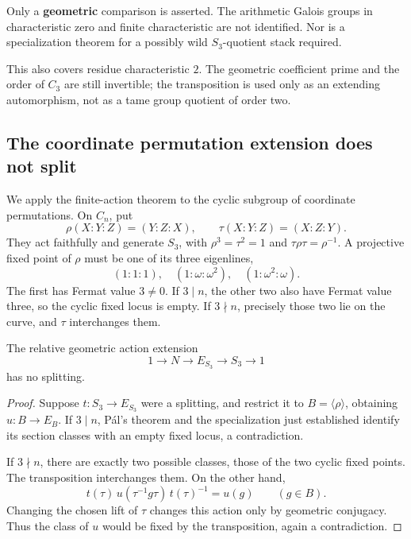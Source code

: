 Only a \textbf{geometric} comparison is asserted. The arithmetic Galois groups in characteristic zero and finite characteristic are not identified. Nor is a specialization theorem for a possibly wild \(S_3\)-quotient stack required.

This also covers residue characteristic \(2\). The geometric coefficient prime and the order of \(C_3\) are still invertible; the transposition is used only as an extending automorphism, not as a tame group quotient of order two.

\subsection{The coordinate permutation extension does not split}
\label{subsec:ff3-s3}

We apply the finite-action theorem to the cyclic subgroup of coordinate
permutations. On \(C_n\), put
\[
 \rho(X:Y:Z)=(Y:Z:X),\qquad \tau(X:Y:Z)=(X:Z:Y).
\]
They act faithfully and generate \(S_3\), with
\(\rho^3=\tau^2=1\) and \(\tau\rho\tau=\rho^{-1}\).
A projective fixed point of \(\rho\) must be one of its three eigenlines,
\[
 (1:1:1),\quad (1:\omega:\omega^2),\quad(1:\omega^2:\omega).
\]
The first has Fermat value \(3\ne0\). If \(3\mid n\), the other two
also have Fermat value three, so the cyclic fixed locus is empty.
If \(3\nmid n\), precisely those two lie on the curve, and \(\tau\)
interchanges them.

\begin{lemma}
\label{lem:ff3-s3-nonsplit}
The relative geometric action extension
\begin{equation}
 1\longrightarrow N\longrightarrow E_{S_3}
 \longrightarrow S_3\longrightarrow1
 \label{eq:ff3-5-1}
\end{equation}
has no splitting.
\end{lemma}
\begin{proof}
Suppose \(t:S_3\to E_{S_3}\) were a splitting, and restrict it to
\(B=\langle\rho\rangle\), obtaining \(u:B\to E_B\).
If \(3\mid n\), Pál's theorem and the specialization just established
identify its section classes with an empty fixed locus, a contradiction.

If \(3\nmid n\), there are exactly two possible classes, those of
the two cyclic fixed points. The transposition interchanges them.
On the other hand,
\[
 t(\tau)\,u(\tau^{-1}g\tau)\,t(\tau)^{-1}=u(g)\qquad(g\in B).
\]
Changing the chosen lift of \(\tau\) changes this action only by
geometric conjugacy. Thus the class of \(u\) would be fixed by the
transposition, again a contradiction.
\end{proof}

